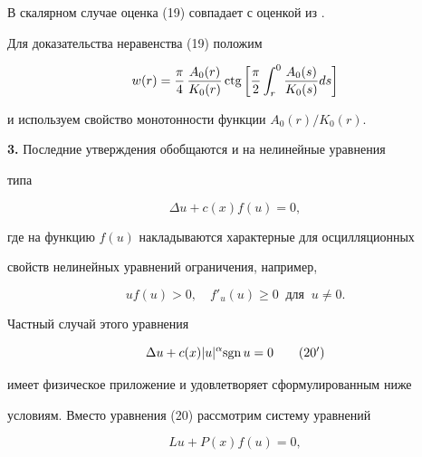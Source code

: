  


В скалярном случае оценка (19) совпадает с оценкой из \cite{7}. 


 


Для доказательства неравенства (19) положим 


$$ 


w(r)=\frac{\pi}{4}\,\frac{A_0(r)}{K_0(r)}\ctg 


\bigg[\frac{\pi}{2}\int^0_r\frac{A_0(s)}{K_0(s)}ds\bigg] 


$$ 


и используем свойство монотонности функции $A_0(r)/K_0(r)$. 


\medskip 


 


{\bf 3.} Последние утверждения обобщаются и на нелинейные уравнения 


типа 


\begin{equation} 


\Delta u+c(x)f(u)=0, 


\end{equation} 


где на функцию $f(u)$ накладываются характерные для осцилляционных 


свойств нелинейных уравнений ограничения, например, \cite{5} 


\begin{equation} 


u f(u)>0,\quad 


f'_u(u)\ge 0\ \text{ для }\ u\ne0. 


\end{equation} 


Частный случай этого уравнения 


\begin{equation} 


\Delta u+c(x)|u|^\alpha\text{sgn\,}u=0\tag{20$'$} 


\end{equation} 


имеет физическое приложение и удовлетворяет сформулированным ниже 


условиям. Вместо уравнения (20) рассмотрим систему уравнений 


\begin{equation} 


L u+P(x)f(u)=0, 


\end{equation} 


